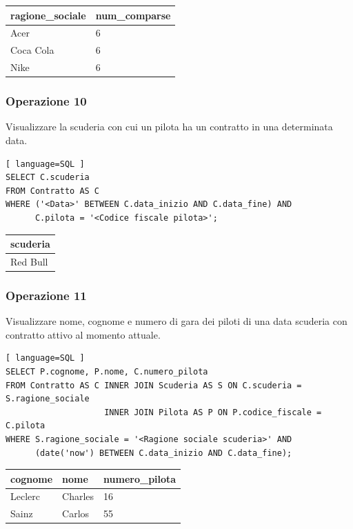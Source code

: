 \documentclass[11pt]{article}
\begin{document}
\begin{table}[H]
    \centering
    \begin{tabular}{|l|l|}
    \hline
        \textbf{ragione\_sociale} & \textbf{num\_comparse} \\ \hline
        Acer & 6 \\ \hline
        Coca Cola & 6 \\ \hline
        Nike & 6 \\ \hline
    \end{tabular}
\end{table}


\subsubsection{Operazione 10}
Visualizzare la scuderia con cui un pilota ha un contratto in una determinata data.
\begin{lstlisting}[ language=SQL ]
SELECT C.scuderia
FROM Contratto AS C
WHERE ('<Data>' BETWEEN C.data_inizio AND C.data_fine) AND
      C.pilota = '<Codice fiscale pilota>';
\end{lstlisting}

\begin{table}[H]
    \centering
    \begin{tabular}{|l|}
    \hline
        scuderia \\ \hline
        Red Bull \\ \hline
    \end{tabular}
\end{table}


\subsubsection{Operazione 11}
Visualizzare nome, cognome e numero di gara dei piloti di una data scuderia con contratto attivo al momento attuale.
\begin{lstlisting}[ language=SQL ]
SELECT P.cognome, P.nome, C.numero_pilota
FROM Contratto AS C INNER JOIN Scuderia AS S ON C.scuderia = S.ragione_sociale 
                    INNER JOIN Pilota AS P ON P.codice_fiscale = C.pilota
WHERE S.ragione_sociale = '<Ragione sociale scuderia>' AND
      (date('now') BETWEEN C.data_inizio AND C.data_fine);
\end{lstlisting}

\begin{table}[H]
    \centering
    \begin{tabular}{|l|l|l|}
    \hline
        cognome & nome & numero\_pilota \\ \hline
        Leclerc & Charles & 16 \\ \hline
        Sainz & Carlos & 55 \\ \hline
    \end{tabular}
\end{table}
\end{document}
